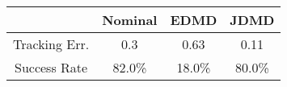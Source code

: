 \begin{tabular}{cccc}
\toprule 
 & {\color{black} \textbf{Nominal}} & {\color{orange} \textbf{EDMD}} & {\color{cyan} \textbf{JDMD}} \\
\midrule 
Tracking Err. & 0.3 & 0.63 & 0.11 \\
Success Rate & 82.0\% & 18.0\% & 80.0\% \\
\bottomrule 
\end{tabular}
